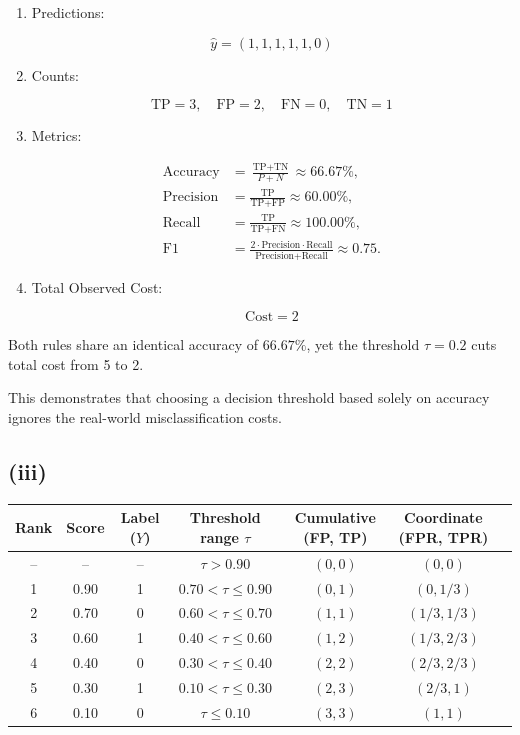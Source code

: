\documentclass[11pt]{article}
\begin{document}
\begin{enumerate}
    \item Predictions:
    
    $$
    \hat{y} = (1, 1, 1, 1, 1, 0)
    $$

    \item Counts:
    
    $$
    \text{TP} = 3
    , \quad \text{FP} = 2
    , \quad \text{FN} = 0,
    \quad \text{TN} = 1
    $$

    \item Metrics:
    
    $$
    \begin{aligned}
    \text{Accuracy} &= \frac{\text{TP} + \text{TN}}{P + N} \approx 66.67\%, \\
    \text{Precision} &= \frac{\text{TP}}{\text{TP} + \text{FP}} \approx 60.00\%, \\
    \text{Recall} &= \frac{\text{TP}}{\text{TP} + \text{FN}} \approx 100.00\%, \\
    \text{F1} &= \frac{2 \cdot \text{Precision} \cdot \text{Recall}}{\text{Precision} + \text{Recall}} \approx 0.75.
    \end{aligned}
    $$

    \item Total Observed Cost:
    
    $$
    \text{Cost} = 2
    $$
\end{enumerate}

Both rules share an identical accuracy of $66.67\%$, yet the threshold $\tau=0.2$ cuts total cost from 5 to 2.

This demonstrates that choosing a decision threshold based solely on accuracy ignores the real-world misclassification costs.

\subsection*{(iii)}

\begin{center}
\begin{tabular}{ccccccc}
\toprule
Rank & Score & Label ($Y$) & Threshold range $\tau$ & Cumulative (FP, TP) & Coordinate (FPR, TPR) \\
\midrule
-- & --   & -- & $\tau > 0.90$          & $(0, 0)$ & $(0, 0)$ \\
1  & 0.90 & 1  & $0.70 < \tau \le 0.90$ & $(0, 1)$ & $(0, 1/3)$ \\
2  & 0.70 & 0  & $0.60 < \tau \le 0.70$ & $(1, 1)$ & $(1/3, 1/3)$ \\
3  & 0.60 & 1  & $0.40 < \tau \le 0.60$ & $(1, 2)$ & $(1/3, 2/3)$ \\
4  & 0.40 & 0  & $0.30 < \tau \le 0.40$ & $(2, 2)$ & $(2/3, 2/3)$ \\
5  & 0.30 & 1  & $0.10 < \tau \le 0.30$ & $(2, 3)$ & $(2/3, 1)$ \\
6  & 0.10 & 0  & $\tau \le 0.10$        & $(3, 3)$ & $(1, 1)$ \\
\bottomrule
\end{tabular}
\end{center}
\end{document}

